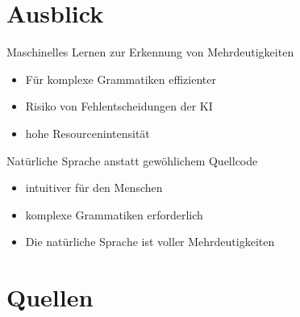 \documentclass[t]{beamer}
\begin{document}
	\section{Ausblick}\label{sec:ausblick-und-zukunftige-projekte}
	\centering
	\begin{frame}
		\begin{block}{Maschinelles Lernen zur Erkennung von Mehrdeutigkeiten}
			\begin{itemize}
				\item Für komplexe Grammatiken effizienter
				\item Risiko von Fehlentscheidungen der KI
				\item hohe Resourcenintensität
			\end{itemize}
		\end{block}
		\vspace{1em}
		\begin{block}{Natürliche Sprache anstatt gewöhlichem Quellcode}
			\begin{itemize}
				\item intuitiver für den Menschen
				\item komplexe Grammatiken erforderlich
				\item Die natürliche Sprache ist voller Mehrdeutigkeiten
			\end{itemize}
		\end{block}
	\end{frame}


	\section{Quellen}\label{sec:quellen}
	\begin{frame}[allowframebreaks]
		
		
	\end{frame}
\end{document}
